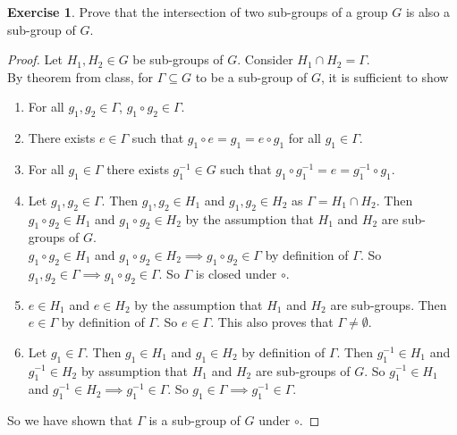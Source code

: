 \documentclass{article}
\theoremstyle{definition}
\newtheorem{theorem}{Exercise}[section]
\newcommand{\inv}[1]{#1^{-1}}
\begin{document}
	
	\begin{theorem}
		Prove that the intersection of two sub-groups of a group $G$ is also a sub-group of $G$. 
	\end{theorem}
	\begin{proof}
		Let $H_1,H_2\in G$ be sub-groups of $G$. Consider $H_1\cap H_2=\Gamma$.\\
		By theorem from class, for $\Gamma\subseteq G$ to be a sub-group of $G$, it is sufficient to show \begin{enumerate}
			\item For all $g_1,g_2\in \Gamma$, $g_1\circ g_2\in \Gamma$.
			
			\item There exists $e\in \Gamma$ such that $g_1\circ e=g_1=e\circ g_1$ for all $g_1\in \Gamma$. 
			
			\item For all $g_1\in \Gamma$ there exists $\inv{g_1}\in G$ such that $g_1\circ\inv{g_1}=e=\inv{g_1}\circ g_1$.
			
			\setcounter{enumi}{0}
			
			\item Let $g_1,g_2\in\Gamma$. Then $g_1,g_2\in H_1$ and $g_1,g_2\in H_2$ as $\Gamma=H_1\cap H_2$. Then $g_1\circ g_2\in H_1$ and $g_1\circ g_2\in H_2$ by the assumption that $H_1$ and $H_2$ are sub-groups of $G$.\\ $g_1\circ g_2\in H_1$ and $g_1\circ g_2\in H_2\implies g_1\circ g_2\in\Gamma$ by definition of $\Gamma$. So $g_1,g_2\in\Gamma\implies g_1\circ g_2\in\Gamma$. So $\Gamma$ is closed under $\circ$. 
			
			\item $e\in H_1$ and $e\in H_2$ by the assumption that $H_1$ and $H_2$ are sub-groups. Then $e\in\Gamma$ by definition of $\Gamma$. So $e\in\Gamma$. This also proves that $\Gamma\not=\emptyset$.
			
			\item Let $g_1\in\Gamma$. Then $g_1\in H_1$ and $g_1\in H_2$ by definition of $\Gamma$. Then $\inv{g_1}\in H_1$ and $\inv{g_1}\in H_2$ by assumption that $H_1$ and $H_2$ are sub-groups of $G$. So $\inv{g_1}\in H_1$ and $\inv{g_1}\in H_2\implies \inv{g_1}\in\Gamma$. So $g_1\in\Gamma\implies\inv{g_1}\in\Gamma$. 
		\end{enumerate} So we have shown that $\Gamma$ is a sub-group of $G$ under $\circ$.
	\end{proof}
\end{document}
